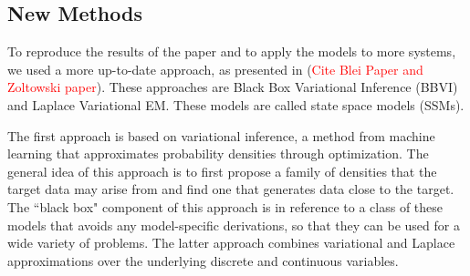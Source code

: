 \subsection{New Methods}

To reproduce the results of the paper and to apply the models to more systems, we used a more up-to-date approach, as presented in (\textcolor{red}{Cite Blei Paper and Zoltowski paper}). These approaches are Black Box Variational Inference (BBVI) and Laplace Variational EM. These models are called state space models (SSMs).

The first approach is based on variational inference, a method from machine learning that approximates probability densities through optimization. The general idea of this approach is to first propose a family of densities that the target data may arise from and find one that generates data close to the target. The ``black box" component of this approach is in reference to a class of these models that avoids any model-specific derivations, so that they can be used for a wide variety of problems. The latter approach combines variational and Laplace approximations over the underlying discrete and continuous variables.

